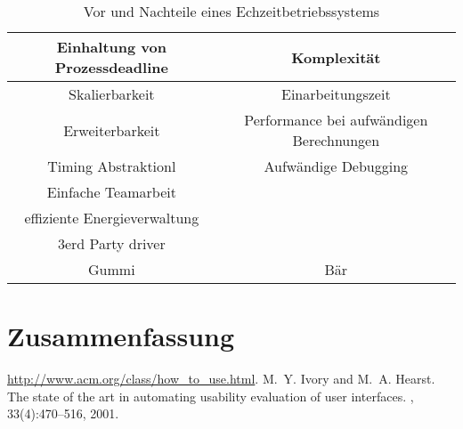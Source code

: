 \documentclass[ngerman]{seminarvorlage}
\begin{document}
\begin{table}[hp]\large
\begin{center}
\begin{tabular}{|c|c|}
\hline
Einhaltung von Prozessdeadline & Komplexität \\
\hline
Skalierbarkeit & Einarbeitungszeit\\
\hline
Erweiterbarkeit & Performance bei aufwändigen Berechnungen\\
\hline
Timing Abstraktionl & Aufwändige Debugging\\
\hline
Einfache Teamarbeit & \\
\hline
effiziente Energieverwaltung & \\
\hline
3erd Party driver& \\
\hline
Gummi & Bär \\
\hline
\end{tabular}
\end{center}
\caption{Vor und Nachteile eines Echzeitbetriebssystems}
\label{tttabelle}
\end{table}


\section{Zusammenfassung}
\pagebreak

%
\begin{thebibliography}{9}
\newblock \url{http://www.acm.org/class/how_to_use.html}.
%
M.~Y. Ivory and M.~A. Hearst.
\newblock The state of the art in automating usability evaluation of user
  interfaces.
, 33(4):470--516, 2001.

\end{thebibliography}


\end{document}
